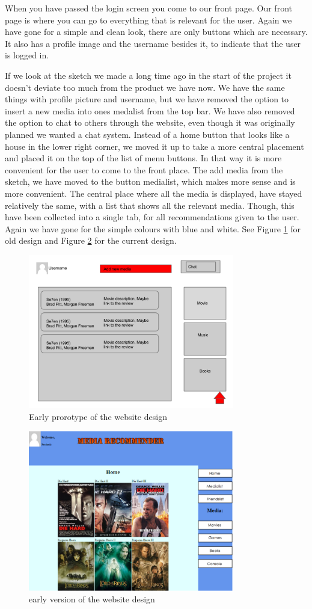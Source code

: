 When you have passed the login screen you come to our front page. Our front page is where you can go to everything that is relevant for the user. Again we have gone for a simple and clean look, there are only buttons which are necessary. It also has a profile image and the username besides it, to indicate that the user is logged in.

If we look at the sketch we made a long time ago in the start of the project it doesn't deviate too much from the product we have now. We have the same things with profile picture and username, but we have removed the option to insert a new media into ones medalist from the top bar. We have also removed the option to chat to others through the website, even though it was originally planned we wanted a chat system.
Instead of a home button that looks like a house in the lower right corner, we moved it up to take a more central placement and placed it on the top of the list of menu buttons. In that way it is more convenient for the user to come to the front place. The add media from the sketch, we have moved to the button medialist, which makes more sense and is more convenient. The central place where all the media is displayed, have stayed relatively the same, with a list that shows all the relevant media. Though, this have been collected into a single tab, for all recommendations given to the user. Again we have gone for the simple colours with blue and white. See Figure \ref{OldSite} for old design and Figure \ref{CurrSite} for the current design.

\begin{figure}[htb]
\centering
\includegraphics[width=0.8\textwidth]{Images/OldSite.png}
\caption{Early prorotype of the website design}
\label{OldSite}
\end{figure}


\begin{figure}[htb]
\centering
\includegraphics[width=0.8\textwidth]{Images/CurrSite.png}
\caption{early version of the website design}
\label{CurrSite}
\end{figure}